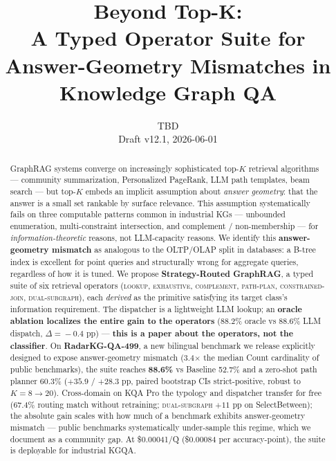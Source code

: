 \documentclass[11pt,a4paper]{article}
\title{Beyond Top-K: \\
A Typed Operator Suite for Answer-Geometry Mismatches in Knowledge Graph QA}
\author{TBD \\ \small{Draft v12.1, 2026-06-01}}
\date{}
\newcommand{\op}[1]{\textsc{\small #1}}
\begin{document}
\maketitle

\begin{abstract}
GraphRAG systems converge on increasingly sophisticated top-$K$ retrieval algorithms --- community summarization, Personalized PageRank, LLM path templates, beam search --- but top-$K$ embeds an implicit assumption about \emph{answer geometry}: that the answer is a small set rankable by surface relevance. This assumption systematically fails on three computable patterns common in industrial KGs --- unbounded enumeration, multi-constraint intersection, and complement / non-membership --- for \emph{information-theoretic} reasons, not LLM-capacity reasons. We identify this \textbf{answer-geometry mismatch} as analogous to the OLTP/OLAP split in databases: a B-tree index is excellent for point queries and structurally wrong for aggregate queries, regardless of how it is tuned. We propose \textbf{Strategy-Routed GraphRAG}, a typed suite of six retrieval operators (\op{lookup}, \op{exhaustive}, \op{complement}, \op{path-plan}, \op{constrained-join}, \op{dual-subgraph}), each \emph{derived} as the primitive satisfying its target class's information requirement. The dispatcher is a lightweight LLM lookup; an \textbf{oracle ablation localizes the entire gain to the operators} (88.2\% oracle vs 88.6\% LLM dispatch, $\Delta\!=\!-0.4$ pp) --- \textbf{this is a paper about the operators, not the classifier}. On \textbf{RadarKG-QA-499}, a new bilingual benchmark we release explicitly designed to expose answer-geometry mismatch (3.4$\times$ the median Count cardinality of public benchmarks), the suite reaches \textbf{88.6\%} vs Baseline 52.7\% and a zero-shot path planner 60.3\% ($+35.9$ / $+28.3$ pp, paired bootstrap CIs strict-positive, robust to $K{=}8{\to}20$). Cross-domain on KQA Pro the typology and dispatcher transfer for free (67.4\% routing match without retraining; \op{dual-subgraph} $+11$ pp on SelectBetween); the absolute gain scales with how much of a benchmark exhibits answer-geometry mismatch --- public benchmarks systematically under-sample this regime, which we document as a community gap. At \$0.00041/Q (\$0.00084 per accuracy-point), the suite is deployable for industrial KGQA.
\end{abstract}

\end{document}
